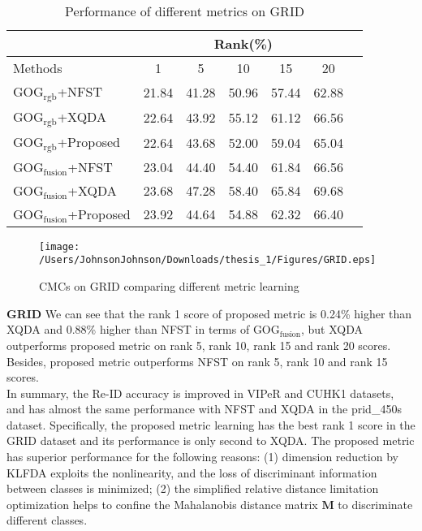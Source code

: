 \begin{table}[H]
\caption{Performance of different metrics on GRID}
\centering
\begin{tabular}{|l|c|c|c|c|c|c|}
\hline
& \multicolumn{5}{|c|}{Rank(\%)} \\
\hline
Methods& 1 & 5 &10& 15&20\\
\hline
GOG$_\text{rgb}$+NFST& 21.84&41.28 &50.96& 57.44&62.88 \\ 
\hline
GOG$_\text{rgb}$+XQDA& 22.64&43.92 &55.12 &61.12&66.56\\ 
\hline
GOG$_\text{rgb}$+Proposed&22.64&43.68&52.00&59.04&65.04\\  %
\hline
GOG$_\text{fusion}$+NFST& 23.04&44.40 &54.40 &61.84&66.56\\ 
\hline
GOG$_\text{fusion}$+XQDA& 23.68&47.28 &58.40 &65.84&69.68 \\ 
\hline
GOG$_\text{fusion}$+Proposed&23.92&44.64&54.88&62.32&66.40\\ %

\hline

\end{tabular}
\end{table}

\begin{figure}[H]
\begin{raggedleft}
\texttt{[image: /Users/JohnsonJohnson/Downloads/thesis\_1/Figures/GRID.eps]}
\vspace{-3em}
\caption{CMCs on GRID comparing different metric learning}
\end{raggedleft}
\end{figure}

\textbf{GRID} We can see that the rank 1 score of proposed metric is 0.24\% higher than XQDA and 0.88\% higher than NFST in terms of GOG$_\text{fusion}$, but XQDA outperforms proposed metric on rank 5, rank 10, rank 15 and rank 20 scores. Besides, proposed metric outperforms NFST on rank 5, rank 10 and rank 15 scores.\\
\indent In summary, the Re-ID accuracy is improved in VIPeR and CUHK1 datasets, and has almost the same performance with NFST and XQDA in the prid\_450s dataset. Specifically, the proposed metric learning has the best rank 1 score in the GRID dataset and its performance is only second to XQDA. The proposed metric has superior performance for the following reasons: (1) dimension reduction by KLFDA exploits the nonlinearity, and the loss of discriminant information between classes is minimized; (2) the simplified relative distance limitation optimization helps to confine the Mahalanobis distance matrix $\bm{M}$ to discriminate different classes.  

